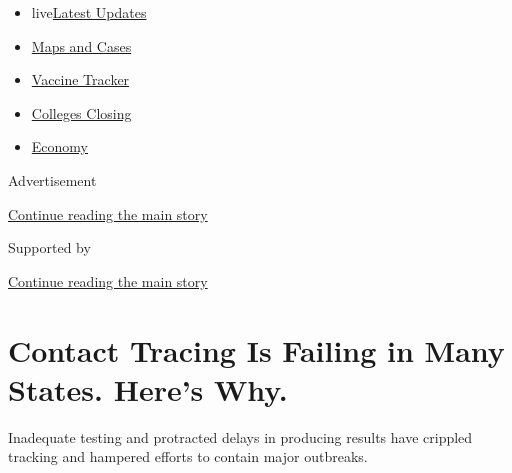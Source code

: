 \begin{itemize}
\tightlist
\item
  live\href{https://www.nytimes3xbfgragh.onion/2020/08/21/world/covid-19-coronavirus.html?name=styln-coronavirus-national\&region=TOP_BANNER\&variant=undefined\&block=storyline_menu_recirc\&action=click\&pgtype=Article\&impression_id=8f1f0af1-e395-11ea-8263-afcaec2efa11}{Latest
  Updates}
\item
  \href{https://www.nytimes3xbfgragh.onion/interactive/2020/us/coronavirus-us-cases.html?name=styln-coronavirus-national\&region=TOP_BANNER\&variant=undefined\&block=storyline_menu_recirc\&action=click\&pgtype=Article\&impression_id=8f1f0af2-e395-11ea-8263-afcaec2efa11}{Maps
  and Cases}
\item
  \href{https://www.nytimes3xbfgragh.onion/interactive/2020/science/coronavirus-vaccine-tracker.html?name=styln-coronavirus-national\&region=TOP_BANNER\&variant=undefined\&block=storyline_menu_recirc\&action=click\&pgtype=Article\&impression_id=8f1f0af3-e395-11ea-8263-afcaec2efa11}{Vaccine
  Tracker}
\item
  \href{https://www.nytimes3xbfgragh.onion/2020/08/19/us/colleges-closing-covid.html?name=styln-coronavirus-national\&region=TOP_BANNER\&variant=undefined\&block=storyline_menu_recirc\&action=click\&pgtype=Article\&impression_id=8f1f0af4-e395-11ea-8263-afcaec2efa11}{Colleges
  Closing}
\item
  \href{https://www.nytimes3xbfgragh.onion/live/2020/08/20/business/stock-market-today-coronavirus?name=styln-coronavirus-national\&region=TOP_BANNER\&variant=undefined\&block=storyline_menu_recirc\&action=click\&pgtype=Article\&impression_id=8f1f3200-e395-11ea-8263-afcaec2efa11}{Economy}
\end{itemize}

Advertisement

\protect\hyperlink{after-top}{Continue reading the main story}

Supported by

\protect\hyperlink{after-sponsor}{Continue reading the main story}

\hypertarget{contact-tracing-is-failing-in-many-states-heres-why}{%
\section{Contact Tracing Is Failing in Many States. Here's
Why.}\label{contact-tracing-is-failing-in-many-states-heres-why}}

Inadequate testing and protracted delays in producing results have
crippled tracking and hampered efforts to contain major outbreaks.

